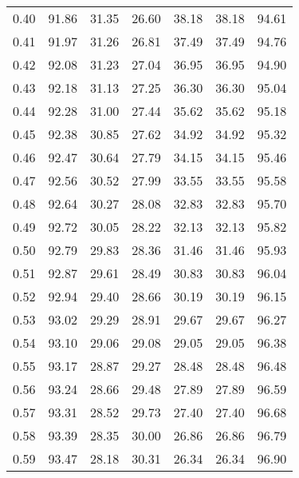 \begin{tabular}{|c|c|c|c|c|c|c|}
      0.40 &     91.86 &     31.35 &      26.60 &   38.18 &      38.18 &         94.61 \\
      0.41 &     91.97 &     31.26 &      26.81 &   37.49 &      37.49 &         94.76 \\
      0.42 &     92.08 &     31.23 &      27.04 &   36.95 &      36.95 &         94.90 \\
      0.43 &     92.18 &     31.13 &      27.25 &   36.30 &      36.30 &         95.04 \\
      0.44 &     92.28 &     31.00 &      27.44 &   35.62 &      35.62 &         95.18 \\
      0.45 &     92.38 &     30.85 &      27.62 &   34.92 &      34.92 &         95.32 \\
      0.46 &     92.47 &     30.64 &      27.79 &   34.15 &      34.15 &         95.46 \\
      0.47 &     92.56 &     30.52 &      27.99 &   33.55 &      33.55 &         95.58 \\
      0.48 &     92.64 &     30.27 &      28.08 &   32.83 &      32.83 &         95.70 \\
      0.49 &     92.72 &     30.05 &      28.22 &   32.13 &      32.13 &         95.82 \\
      0.50 &     92.79 &     29.83 &      28.36 &   31.46 &      31.46 &         95.93 \\
      0.51 &     92.87 &     29.61 &      28.49 &   30.83 &      30.83 &         96.04 \\
      0.52 &     92.94 &     29.40 &      28.66 &   30.19 &      30.19 &         96.15 \\
      0.53 &     93.02 &     29.29 &      28.91 &   29.67 &      29.67 &         96.27 \\
      0.54 &     93.10 &     29.06 &      29.08 &   29.05 &      29.05 &         96.38 \\
      0.55 &     93.17 &     28.87 &      29.27 &   28.48 &      28.48 &         96.48 \\
      0.56 &     93.24 &     28.66 &      29.48 &   27.89 &      27.89 &         96.59 \\
      0.57 &     93.31 &     28.52 &      29.73 &   27.40 &      27.40 &         96.68 \\
      0.58 &     93.39 &     28.35 &      30.00 &   26.86 &      26.86 &         96.79 \\
      0.59 &     93.47 &     28.18 &      30.31 &   26.34 &      26.34 &         96.90 \\

\end{tabular}

